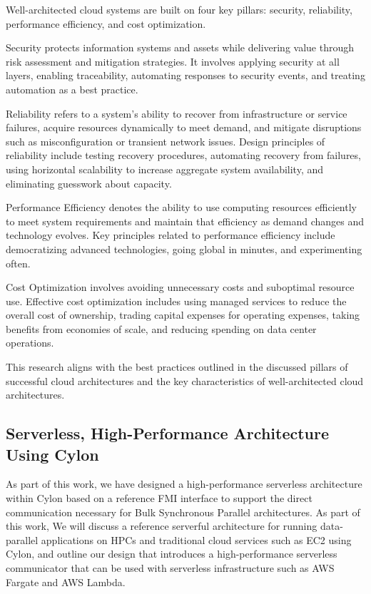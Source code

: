 \documentclass[conference]{IEEEtran}
\begin{document}
Well-architected cloud systems are built on four key pillars: security, reliability, performance efficiency, and cost optimization\cite{aws_well_architected_framework}.

Security protects information systems and assets while delivering value through risk assessment and mitigation strategies. It involves applying security at all layers, enabling traceability, automating responses to security events, and treating automation as a best practice\cite{aws_well_architected_framework}.

Reliability refers to a system’s ability to recover from infrastructure or service failures, acquire resources dynamically to meet demand, and mitigate disruptions such as misconfiguration or transient network issues. Design principles of reliability include testing recovery procedures, automating recovery from failures, using horizontal scalability to increase aggregate system availability, and eliminating guesswork about capacity\cite{aws_well_architected_framework}.

Performance Efficiency denotes the ability to use computing resources efficiently to meet system requirements and maintain that efficiency as demand changes and technology evolves. Key principles related to performance efficiency include democratizing advanced technologies, going global in minutes, and experimenting often\cite{aws_well_architected_framework}.

Cost Optimization involves avoiding unnecessary costs and suboptimal resource use. Effective cost optimization includes using managed services to reduce the overall cost of ownership, trading capital expenses for operating expenses, taking benefits from economies of scale, and reducing spending on data center operations\cite{aws_well_architected_framework}.

This research aligns with the best practices outlined in the discussed pillars of successful cloud architectures and the key characteristics of well-architected cloud architectures. 

\subsection{Serverless, High-Performance Architecture Using Cylon}
As part of this work, we have designed a high-performance serverless architecture within Cylon based on a reference FMI interface to support the direct communication necessary for Bulk Synchronous Parallel architectures. As part of this work, We will discuss a reference serverful architecture for running data-parallel applications on HPCs and traditional cloud services such as EC2 using Cylon, and outline our design that introduces a high-performance serverless communicator that can be used with serverless infrastructure such as AWS Fargate and AWS Lambda.
\end{document}
